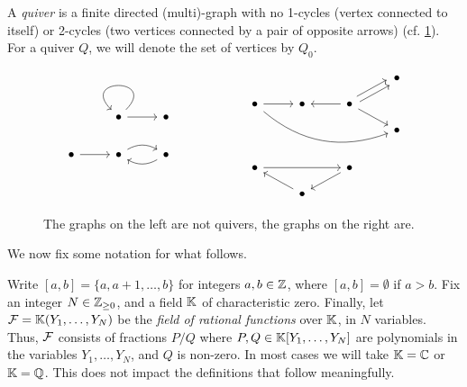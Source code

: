 \begin{definition}[Quivers]

	A \emph{quiver} is a finite directed (multi)-graph with no 1-cycles
	(vertex connected to itself) or 2-cycles (two vertices connected by a pair of opposite
	arrows) (cf. \cref{fig:quivers}). For a quiver $Q$, we will denote the set of vertices
	by $Q_0$.
\end{definition}

\begin{figure}[ht!]
	\centering
	\begin{equation*}
		\begin{tikzcd}
			&\bullet \arrow[loop] \arrow[r] &\bullet \\
			\bullet \rar & \bullet \arrow[r, bend left] & \bullet \arrow[l, bend left]
		\end{tikzcd}
		\hspace{2cm}
		\begin{tikzcd}[row sep=small]
			&&& \bullet \\
			\bullet \ar[rrrd, bend right]\rar &\bullet  \rar[leftarrow] &\bullet \ar[ru, shift left] \ar[ru, shift right] \ar[rd] \\
			&&& \bullet\\
			\\
			\bullet \ar[rr] && \bullet \ar[ld]\\
			& \bullet \ar[lu]
		\end{tikzcd}
	\end{equation*}
	\caption{The graphs on the left are not quivers, the graphs on the right are.}
	\label{fig:quivers}
\end{figure}

We now fix some notation for what follows.
\begin{notation}
	Write $[a,b] = \{a, a + 1, \dots, b\}$
	for integers $a,b \in \mathbb{Z}$, where $[a,b] = \emptyset$ if $a > b$. Fix an integer $N
		\in \mathbb{Z}_{\geq 0}$, and a field $\mathbb{K}$ of characteristic zero. Finally, let $\mathcal{F} =
		\mathbb{K} (Y_1, \dots, Y_N)$ be the \emph{field of rational functions} over $\mathbb{K}$, in $N$ variables. Thus, $\mathcal{F}$ consists of fractions $P/Q$
	where $P, Q\in \mathbb{K}[Y_1, \dots, Y_N]$ are polynomials in the variables $Y_1, \dots,
		Y_N$, and $Q$ is non-zero. In most cases we will take $\mathbb{K} = \mathbb{C}$ or $\mathbb{K} = \mathbb{Q}$.
	This does not impact the definitions that follow meaningfully.
\end{notation}

